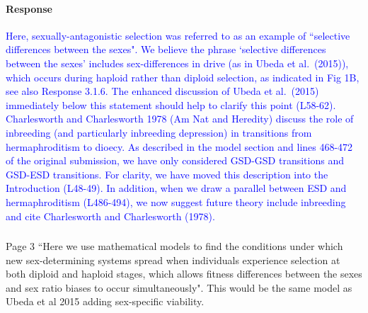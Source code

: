 \documentclass[10pt,letterpaper]{article}
\begin{document}
\noindent\paragraph{Response}
\textcolor{blue}{
Here, sexually-antagonistic selection was referred to as an example of ``selective differences between the sexes". 
We believe the phrase `selective differences between the sexes' includes sex-differences in drive (as in Ubeda et al.\ (2015)), which occurs during haploid rather than diploid selection, as indicated in Fig 1B, see also Response 3.1.6.
The enhanced discussion of Ubeda et al.\ (2015) immediately below this statement should help to clarify this point (L58-62).
\\
\indent 
Charlesworth and Charlesworth 1978 (Am Nat and Heredity) discuss the role of inbreeding (and particularly inbreeding depression) in transitions from hermaphroditism to dioecy. 
As described in the model section and lines 468-472 of the original submission, we have only considered GSD-GSD transitions and GSD-ESD transitions.
For clarity, we have moved this description into the Introduction (L48-49). 
In addition, when we draw a parallel between ESD and hermaphroditism (L486-494), we now suggest future theory include inbreeding and cite Charlesworth and Charlesworth (1978). 
}

\noindent\subsubsection{}
Page 3 ``Here we use mathematical models to find the conditions under which new sex-determining systems spread when individuals experience selection at both diploid and haploid stages, which allows fitness differences between the sexes and sex ratio biases to occur simultaneously".
This would be the same model as Ubeda et al 2015 adding sex-specific viability.
\end{document}
